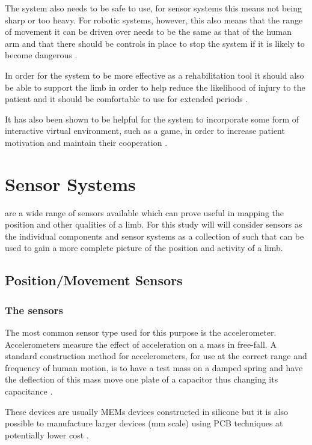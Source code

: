 \documentclass[journal]{IEEEtran}
\begin{document}
The system also needs to be safe to use, for sensor systems this means not being sharp 
or too heavy. For robotic systems, however, this also means that the range of movement it can be 
driven over needs to be the same as that of the human arm and that there should be controls in 
place to stop the system if it is likely to become dangerous \cite{ARMin}.

In order for the system to be more effective as a rehabilitation tool it should also be able to 
support the limb in order to help reduce the likelihood of injury to the patient and it should 
be comfortable to use for extended periods \cite{AdvancesPush}.

It has also been shown to be helpful for the system to incorporate some form of interactive 
virtual environment, such as a game, in order to increase patient motivation and maintain 
their cooperation \cite{AdvancesPush}.

\section{Sensor Systems}
 are a wide range of sensors available which can prove useful in 
mapping the position and other qualities of a limb. For this study will will consider sensors 
as the individual components and sensor systems as a collection of such that can be used 
to gain a more complete picture of the position and activity of a limb.

\subsection{Position/Movement Sensors}
\subsubsection{The sensors}
The most common sensor type used for this purpose is the accelerometer. Accelerometers measure 
the effect of acceleration on a mass in free-fall. A standard construction method for accelerometers, 
for use at the correct range and frequency of human motion, is to have a test mass on a damped spring 
and have the deflection of this mass move one plate of a capacitor thus changing its capacitance \cite{lowCostACs}.

These devices are usually MEMs devices constructed in silicone but it is also possible to manufacture 
larger devices (mm scale) using PCB techniques at potentially lower cost \cite{lowCostACs}.
\end{document}
